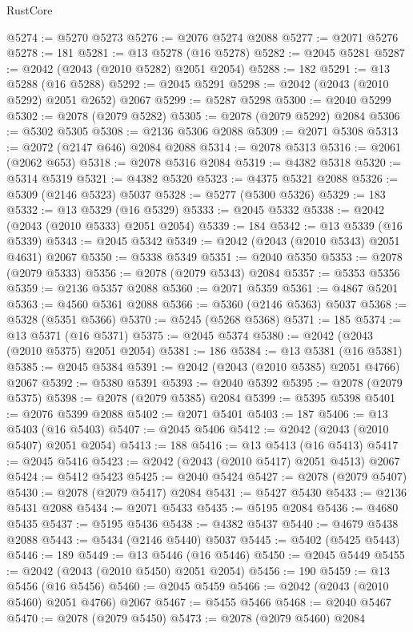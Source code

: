 \begin{lexlean}{RustCore}
\begin{coremodule}
@5274 := @5270 @5273
@5276 := @2076 @5274 @2088
@5277 := @2071 @5276
@5278 := 181
@5281 := @13 @5278 (@16 @5278)
@5282 := @2045 @5281
@5287 := @2042 (@2043 (@2010 @5282) @2051 @2054)
@5288 := 182
@5291 := @13 @5288 (@16 @5288)
@5292 := @2045 @5291
@5298 := @2042 (@2043 (@2010 @5292) @2051 @2652) @2067
@5299 := @5287 @5298
@5300 := @2040 @5299
@5302 := @2078 (@2079 @5282)
@5305 := @2078 (@2079 @5292) @2084
@5306 := @5302 @5305
@5308 := @2136 @5306 @2088
@5309 := @2071 @5308
@5313 := @2072 (@2147 @646) @2084 @2088
@5314 := @2078 @5313
@5316 := @2061 (@2062 @653)
@5318 := @2078 @5316 @2084
@5319 := @4382 @5318
@5320 := @5314 @5319
@5321 := @4382 @5320
@5323 := @4375 @5321 @2088
@5326 := @5309 (@2146 @5323) @5037
@5328 := @5277 (@5300 @5326)
@5329 := 183
@5332 := @13 @5329 (@16 @5329)
@5333 := @2045 @5332
@5338 := @2042 (@2043 (@2010 @5333) @2051 @2054)
@5339 := 184
@5342 := @13 @5339 (@16 @5339)
@5343 := @2045 @5342
@5349 := @2042 (@2043 (@2010 @5343) @2051 @4631) @2067
@5350 := @5338 @5349
@5351 := @2040 @5350
@5353 := @2078 (@2079 @5333)
@5356 := @2078 (@2079 @5343) @2084
@5357 := @5353 @5356
@5359 := @2136 @5357 @2088
@5360 := @2071 @5359
@5361 := @4867 @5201
@5363 := @4560 @5361 @2088
@5366 := @5360 (@2146 @5363) @5037
@5368 := @5328 (@5351 @5366)
@5370 := @5245 (@5268 @5368)
@5371 := 185
@5374 := @13 @5371 (@16 @5371)
@5375 := @2045 @5374
@5380 := @2042 (@2043 (@2010 @5375) @2051 @2054)
@5381 := 186
@5384 := @13 @5381 (@16 @5381)
@5385 := @2045 @5384
@5391 := @2042 (@2043 (@2010 @5385) @2051 @4766) @2067
@5392 := @5380 @5391
@5393 := @2040 @5392
@5395 := @2078 (@2079 @5375)
@5398 := @2078 (@2079 @5385) @2084
@5399 := @5395 @5398
@5401 := @2076 @5399 @2088
@5402 := @2071 @5401
@5403 := 187
@5406 := @13 @5403 (@16 @5403)
@5407 := @2045 @5406
@5412 := @2042 (@2043 (@2010 @5407) @2051 @2054)
@5413 := 188
@5416 := @13 @5413 (@16 @5413)
@5417 := @2045 @5416
@5423 := @2042 (@2043 (@2010 @5417) @2051 @4513) @2067
@5424 := @5412 @5423
@5425 := @2040 @5424
@5427 := @2078 (@2079 @5407)
@5430 := @2078 (@2079 @5417) @2084
@5431 := @5427 @5430
@5433 := @2136 @5431 @2088
@5434 := @2071 @5433
@5435 := @5195 @2084
@5436 := @4680 @5435
@5437 := @5195 @5436
@5438 := @4382 @5437
@5440 := @4679 @5438 @2088
@5443 := @5434 (@2146 @5440) @5037
@5445 := @5402 (@5425 @5443)
@5446 := 189
@5449 := @13 @5446 (@16 @5446)
@5450 := @2045 @5449
@5455 := @2042 (@2043 (@2010 @5450) @2051 @2054)
@5456 := 190
@5459 := @13 @5456 (@16 @5456)
@5460 := @2045 @5459
@5466 := @2042 (@2043 (@2010 @5460) @2051 @4766) @2067
@5467 := @5455 @5466
@5468 := @2040 @5467
@5470 := @2078 (@2079 @5450)
@5473 := @2078 (@2079 @5460) @2084

\end{coremodule}
\end{lexlean}

